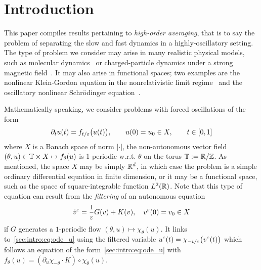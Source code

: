 

\section{Introduction}
\label{section:introduction}


This paper compiles results pertaining to \textit{high-order averaging},
that is to say the problem of separating the slow and fast dynamics in a
highly-oscillatory setting. The type of problem we consider may arise in
many realistic physical models, such as molecular
dynamics~\cite{garciaarchilla.1998.long} or charged-particle dynamics under a
strong magnetic field~\cite{chartier.2020.uniformly,
frenod.2009.long,frenod.2000.long}. It may also arise in functional
spaces; two examples are the nonlinear Klein-Gordon equation in the
nonrelativistic limit regime~\cite{bao.2014.uniformly,
bao.2019.comparison, chartier.2020.new} and the oscillatory nonlinear
Schrödinger equation~\cite{chartier.2015.uniformly,
castella.2015.stroboscopic}.


Mathematically speaking, we consider problems with forced oscillations of
the form 
\begin{equation} \label{sec:intro:eq:ode_u}
  \partial_t u(t) = f_{t/\varepsilon}\big( u(t) \big) , 
  \qquad 
  u(0) = u_0 \in X, 
  \qquad
  t \in [0, 1] 
\end{equation}
where \( X \) is a Banach space of norm \( | \cdot | \), the
non-autonomous vector field \( (\theta,u) \in \mathbb{T} \times X \mapsto
f_\theta(u) \) is 1-periodic w.r.t. \( \theta \) on the torus \( \mathbb{T} :=
\mathbb{R}/\mathbb{Z} \). As mentioned, the space \(X\) may be simply \( \mathbb{R}^d \), in which
case the problem is a simple ordinary differential equation in finite
dimension, or it may be a functional space, such as the space of
square-integrable function \( L^2(\mathbb{R}) \). 
%
Note that this type of equation can result from the \textit{filtering} of
an autonomous equation
\begin{equation} \label{sec:intro:eq:ode_auto}
  \dot v^{\varepsilon} = \frac{1}{\varepsilon} G(v) + K(v), \quad v^{\varepsilon}(0)=v_0 \in X
\end{equation}
if $G$ generates a $1$-periodic flow $(\theta, u) \mapsto \chi_\theta(u)$.
It links to~\ref{sec:intro:eq:ode_u} using the filtered variable 
$u^{\varepsilon}(t) = \chi_{-t/\varepsilon}\big(v^{\varepsilon}(t) \big)$ which
follows an equation of the form~\eqref{sec:intro:eq:ode_u} with
$f_{\theta}(u) = \left(\partial_u \chi_{-\theta}\cdot K \right) \circ
\chi_{\theta}(u)$. 


